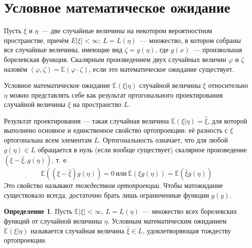 \documentclass[oneside,final,14pt]{extreport}
\theoremstyle{plain}
\theoremstyle{definition}
\newtheorem*{defn}{Определение}
\theoremstyle{named}
\begin{document}
\section{Условное математическое ожидание}

Пусть $\xi$ и $\eta$~--- две случайные величины на некотором вероятностном пространстве, причём $E|\xi|<\infty$; $L=L(\eta)$~--- множество, в котором собраны все случайные величины, имеющие вид $\zeta=g(\eta)$, где $g(x)$~--- произвольная борелевская функция. Скалярным произведением двух случайных величин $\varphi$ и $\zeta$ назовём $(\varphi, \zeta)=\mathbb{E}(\varphi \cdot \zeta)$, если это математическое ожидание существует.

Условное математическое ожидание $\mathbb{E}(\xi | \eta)$ случайной величины $\xi$ относительно $\eta$ можно представлять себе как результат ортогонального проектирования случайной величины $\xi$ на пространство $L$.

Результат проектирования — такая случайная величина $\mathbb{E}(\xi | \eta)=\widehat{\xi}$, для которой выполнено основное и единственное свойство ортопроекции: её разность с $\xi$ ортогональна всем элементам $L$. Ортогональность означает, что для любой $g(\eta) \in L$ обращается в нуль (если вообще существует) скалярное произведение $(\xi-\widehat{\xi}, g(\eta))$, т. е.
\begin{equation*}
    \mathbb{E}((\xi-\widehat{\xi}) g(\eta))=0~ \text{или}~ \mathbb{E}(\xi g(\eta))=\mathbb{E}(\widehat{\xi} g(\eta))
\end{equation*}
Это свойство называют {\it тождеством ортопроекции}. Чтобы матожидание существовало всегда, достаточно брать лишь ограниченные функции $g(y)$.

\begin{defn}
    Пусть $\mathbb{E}|\xi|<\infty$, $L=L(\eta)$~--- множество всех борелевских функций от случайной величины $\eta$. Условным математическим ожиданием $\mathbb{E}(\xi | \eta)$ называется случайная величина $\widehat{\xi} \in L$, удовлетворяющая тождеству ортопроекции.
\end{defn}
\end{document}
